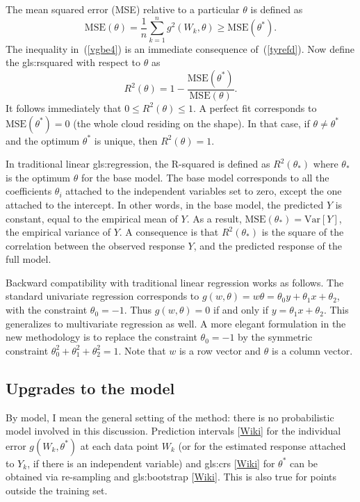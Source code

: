 \documentclass[oneside,10pt]{book}
\begin{document}
\noindent The \textcolor{index}{mean squared error} (MSE) relative to a particular $\theta$ is defined as
\begin{equation}
\text{MSE}(\theta)=\frac{1}{n}\sum_{k=1}^n g^2(W_k,\theta) \geq \text{MSE}(\theta^*). \label{vgbe4}
\end{equation}
The inequality in~(\ref{vgbe4})  is an immediate consequence of~(\ref{tyrefd}). Now define the
\gls{gls:rsquared}
 with respect to
 $\theta$ as
\begin{equation}
R^2(\theta)=1 - \frac{\text{MSE}(\theta^*)}{\text{MSE}(\theta)}. \label{rsqwa}
\end{equation}
It follows immediately that $0\leq R^2(\theta)\leq 1$. A perfect fit corresponds to $\text{MSE}(\theta^*)=0$ (the whole cloud residing on the shape). In that case,  if $\theta\neq \theta^*$ and the optimum $\theta^*$ is unique, then $R^2(\theta)=1$.

In traditional linear \gls{gls:regression}, the R-squared is defined as $R^2(\theta_*)$ where $\theta_*$ is the optimum $\theta$ for the base model.
The base model corresponds to all the coefficients $\theta_i$ attached to the independent variables set to zero, except the one attached to the intercept. In other words, in the base model, the predicted $Y$ is constant, equal to the empirical mean of $Y$. As a result,  $\text{MSE}(\theta_*)=\text{Var}[Y]$, the empirical variance of $Y$. A consequence is that $R^2(\theta_*)$ is the square of the
 correlation between the observed response $Y$, and the predicted response of the full model.


Backward compatibility with traditional linear regression works as follows. The standard univariate regression corresponds to
$g(w,\theta) = w \theta =\theta_0 y +\theta_1 x + \theta_2$, with the constraint $\theta_0=-1$.  Thus $g(w,\theta)=0$ if and only if
 $y= \theta_1 x + \theta_2$. This generalizes to multivariate regression as well.
A more elegant formulation in the new methodology is to replace the constraint $\theta_0=-1$ by the symmetric constraint $\theta_0^2+\theta_1^2+\theta_2^2=1$.
 Note that $w$ is a row vector and $\theta$ is a column vector.

\subsection{Upgrades to the model}

By model, I mean the general setting of the method: there is no probabilistic model involved in this discussion.
\textcolor{index}{Prediction intervals} [\href{https://en.wikipedia.org/wiki/Prediction_interval}{Wiki}] for the individual error $g(W_k,\theta^*)$ at each data point $W_k$ (or for the estimated response attached to $Y_k$, if there is an independent variable) and
 \glspl{gls:cr} [\href{https://en.wikipedia.org/wiki/Confidence_region}{Wiki}] for $\theta^*$ can be obtained via re-sampling and \gls{gls:bootstrap} [\href{https://en.wikipedia.org/wiki/Bootstrapping_(statistics)}{Wiki}]. This is also true for points outside the training set.
\end{document}
